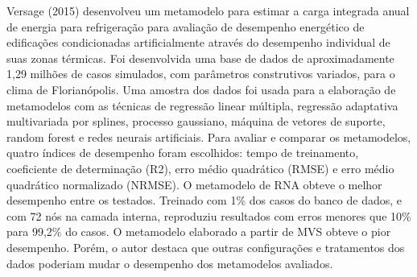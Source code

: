 \documentclass[brazil,hardcopy,openany,a5paper]{ufscthesis}
\begin{document}
	Versage (2015) desenvolveu um metamodelo para estimar a carga integrada anual de energia para refrigeração para avaliação de desempenho energético de edificações condicionadas artificialmente através do desempenho individual de suas zonas térmicas. Foi desenvolvida uma base de dados de aproximadamente 1,29 milhões de casos simulados, com parâmetros construtivos variados, para o clima de Florianópolis. Uma amostra dos dados foi usada para a elaboração de metamodelos com as técnicas de regressão linear múltipla, regressão adaptativa multivariada por splines, processo gaussiano, máquina de vetores de suporte, random forest e redes neurais artificiais. Para avaliar e comparar os metamodelos, quatro índices de desempenho foram escolhidos: tempo de treinamento, coeficiente de determinação (R2), erro médio
	quadrático (RMSE) e erro médio quadrático normalizado (NRMSE). O metamodelo de RNA obteve o melhor desempenho entre os testados. Treinado
	com 1\% dos casos do banco de dados, e com 72 nós na camada interna, reproduziu resultados com erros menores que 10\% para 99,2\% do casos. O metamodelo elaborado a partir de MVS obteve o pior desempenho. Porém, o autor destaca que outras configurações e tratamentos dos dados poderiam mudar o desempenho dos metamodelos avaliados.

%
%

	
\end{document}
